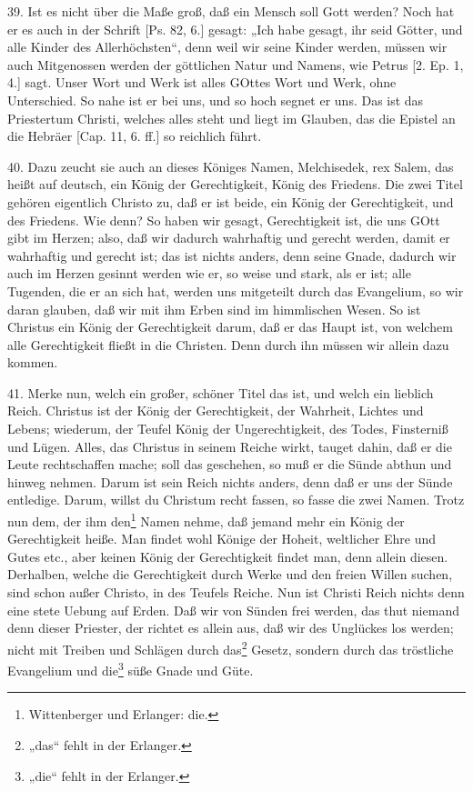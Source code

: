 39. Ist es nicht über die Maße groß, daß ein Mensch soll Gott werden? Noch hat er es auch in der Schrift [Ps. 82, 6.] gesagt: „Ich habe gesagt, ihr seid Götter, und alle Kinder des Allerhöchsten“, denn weil wir seine Kinder werden, müssen wir auch Mitgenossen werden der göttlichen Natur und Namens, wie Petrus [2. Ep. 1, 4.] sagt. Unser Wort und Werk ist alles GOttes Wort und Werk, ohne Unterschied. So nahe ist er bei uns, und so hoch segnet er uns. Das ist das Priestertum Christi, welches alles steht und liegt im Glauben, das die Epistel an die Hebräer [Cap. 11, 6. ff.] so reichlich führt.

40. Dazu zeucht sie auch an dieses Königes Namen, Melchisedek, rex Salem, das heißt auf deutsch, ein König der Gerechtigkeit, König des Friedens. Die zwei Titel gehören eigentlich Christo zu, daß er ist beide, ein König der Gerechtigkeit, und des Friedens. Wie denn? So haben wir gesagt, Gerechtigkeit ist, die uns GOtt gibt im Herzen; also, daß wir dadurch wahrhaftig und gerecht werden, damit er wahrhaftig und gerecht ist; das ist nichts anders, denn seine Gnade, dadurch wir auch im Herzen gesinnt werden wie er, so weise und stark, als er ist; alle Tugenden, die er an sich hat, werden uns mitgeteilt durch das Evangelium, so wir daran glauben, daß wir mit ihm Erben sind im himmlischen Wesen. So ist Christus ein König der Gerechtigkeit darum, daß er das Haupt ist, von welchem alle Gerechtigkeit fließt in die Christen. Denn durch ihn müssen wir allein dazu kommen.

41. Merke nun, welch ein großer, schöner Titel das ist, und welch ein lieblich Reich. Christus ist der König der Gerechtigkeit, der Wahrheit, Lichtes und Lebens; wiederum, der Teufel König der Ungerechtigkeit, des Todes, Finsterniß und Lügen. Alles, das Christus in seinem Reiche wirkt, tauget dahin, daß er die Leute rechtschaffen mache; soll das geschehen, so muß er die Sünde abthun und hinweg nehmen. Darum ist sein Reich nichts anders, denn daß er uns der Sünde entledige. Darum, willst du Christum recht fassen, so fasse die zwei Namen. Trotz nun dem, der ihm den\footnote{Wittenberger und Erlanger: die.} Namen nehme, daß jemand mehr ein König der Gerechtigkeit heiße. Man findet wohl Könige der Hoheit, weltlicher Ehre und Gutes etc., aber keinen König der Gerechtigkeit findet man, denn allein diesen. Derhalben, welche die Gerechtigkeit durch Werke und den freien Willen suchen, sind schon außer Christo, in des Teufels Reiche. Nun ist Christi Reich nichts denn eine stete Uebung auf Erden. Daß wir von Sünden frei werden, das thut niemand denn dieser Priester, der richtet es allein aus, daß wir des Unglückes los werden; nicht mit Treiben und Schlägen durch das\footnote{„das“ fehlt in der Erlanger.} Gesetz, sondern durch das tröstliche Evangelium und die\footnote{„die“ fehlt in der Erlanger.} süße Gnade und Güte.

